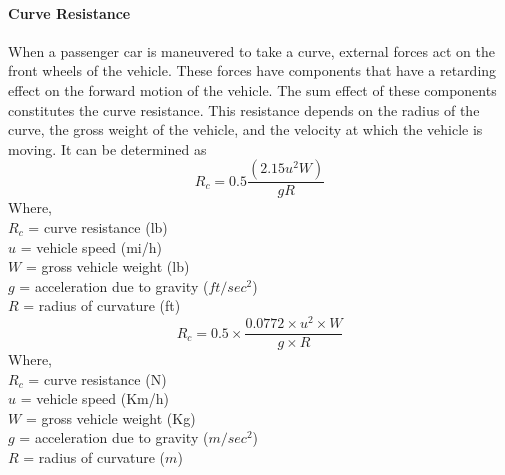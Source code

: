 \paragraph{Curve Resistance}
When a passenger car is maneuvered to take a curve, external forces act on the front wheels of the vehicle. These forces have components that have a retarding effect on the forward motion of the vehicle. The sum effect of these components constitutes the curve resistance. This resistance depends on the radius of the curve, the gross weight of the vehicle, and the velocity at which the vehicle is moving. It can be determined as
\begin{equation}
	R_c = 0.5 \frac{(2.15 u^2 W)}{gR}
\end{equation}
Where,\\
\hspace*{10mm}$R_c$ = curve resistance (lb)\\
\hspace*{10mm}$u$ = vehicle speed (mi/h)\\
\hspace*{10mm}$W$ = gross vehicle weight (lb)\\
\hspace*{10mm}$g$ = acceleration due to gravity ($ft/sec^2$)\\
\hspace*{10mm}$R$ = radius of curvature (ft)
\begin{equation}
	R_c = 0.5 \times \frac{0.0772 \times u^2 \times W}{g \times R}
\end{equation}
Where,\\
\hspace*{10mm}$R_c$ = curve resistance (N)\\
\hspace*{10mm}$u$ = vehicle speed (Km/h)\\
\hspace*{10mm}$W$ = gross vehicle weight (Kg)\\
\hspace*{10mm}$g$ = acceleration due to gravity ($m/sec^2$)\\
\hspace*{10mm}$R$ = radius of curvature ($ m $)
